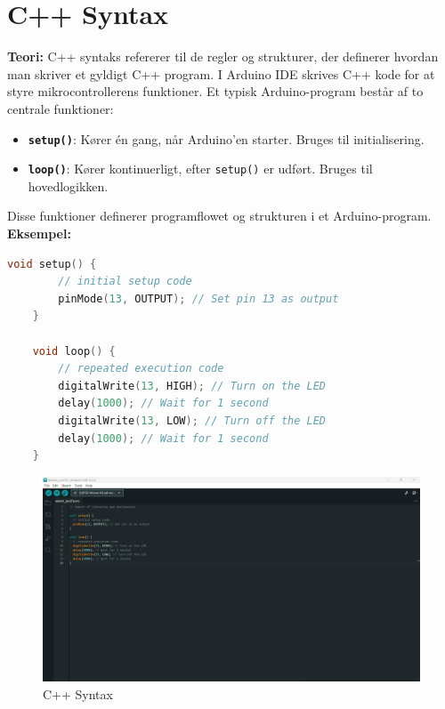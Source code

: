 \section{C++ Syntax}
\textbf{Teori:} C++ syntaks refererer til de regler og strukturer, der definerer hvordan man skriver et gyldigt C++ program. I Arduino IDE skrives C++ kode for at styre mikrocontrollerens funktioner. Et typisk Arduino-program består af to centrale funktioner:
\begin{itemize}
	\item \textbf{\texttt{setup()}}: Kører én gang, når Arduino'en starter. Bruges til initialisering.
	\item \textbf{\texttt{loop()}}: Kører kontinuerligt, efter \texttt{setup()} er udført. Bruges til hovedlogikken.
\end{itemize}
Disse funktioner definerer programflowet og strukturen i et Arduino-program.
\newline\newline
\noindent\textbf{Eksempel:}
\begin{lstlisting}[language=C++]
	void setup() {
		// initial setup code
		pinMode(13, OUTPUT); // Set pin 13 as output
	}
	
	void loop() {
		// repeated execution code
		digitalWrite(13, HIGH); // Turn on the LED
		delay(1000); // Wait for 1 second
		digitalWrite(13, LOW); // Turn off the LED
		delay(1000); // Wait for 1 second
	}
\end{lstlisting}
\begin{figure}[h!]
	\centering
	\includegraphics[width=\textwidth]{fig/fig19.png}
	\caption{C++ Syntax}
	\label{fig:19}
\end{figure}


